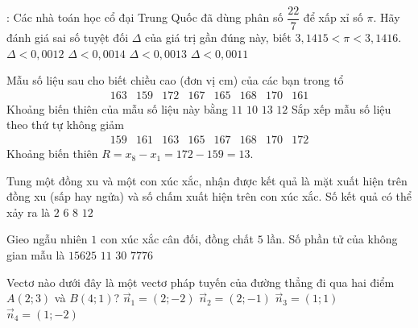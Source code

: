 \begin{ex}  :%
Các nhà toán học cổ đại Trung Quốc đã dùng phân số $\dfrac{22}{7}$ để xấp xỉ số $\pi $. Hãy đánh giá sai số tuyệt đối $\Delta $ của giá trị gần đúng này, biết $3{,}1415<\pi <3{,}1416$.
\choice
{$\Delta <0{,}0012$}
{$\Delta <0{,}0014$}
{\True $\Delta <0{,}0013$}
{$\Delta <0{,}0011$}
\end{ex}

\begin{ex}%
Mẫu số liệu sau cho biết chiều cao (đơn vị cm) của các bạn trong tổ
\[\begin{array}{llllllll}163 & 159 & 172 & 167 & 165 & 168 & 170 & 161\end{array}\]
Khoảng biến thiên của mẫu số liệu này bằng
\choice
{$11$}
{$10$}
{\True $13$}
{$12$}
\loigiai
{
Sắp xếp mẫu số liệu theo thứ tự không giảm
\[
\begin{array}{llllllll}
159 & 161 & 163 & 165 & 167 & 168 & 170 & 172
\end{array}
\]
Khoảng biến thiên $R=x_8-x_1=172-159=13$.
}
\end{ex}

\begin{ex}%
Tung một đồng xu và một con xúc xắc, nhận được kết quả là mặt xuất hiện trên đồng xu (sấp hay ngửa) và số chấm xuất hiện trên con xúc xắc. Số kết quả có thể xảy ra là
\choice
{$2$}
{$6$}
{$8$}
{\True $12$}
\end{ex}

\begin{ex}%
Gieo ngẫu nhiên $1$ con xúc xắc cân đối, đồng chất $5$ lần. Số phần tử của không gian mẫu là
\choice
{$15625$}
{$11$}
{$30$}
{\True$7776$}
\end{ex}

\begin{ex}%
Vectơ nào dưới đây là một vectơ pháp tuyến của đường thẳng đi qua hai điểm $A(2;3)$ và $B(4;1)$?
\choice
{ $\overrightarrow{n}_{1}=(2;-2)$}
{$\overrightarrow{n}_{2}=(2;-1)$}
{\True$\overrightarrow{n}_{3}=(1;1)$}
{$\overrightarrow{n}_{4}=(1;-2)$}
\end{ex}

